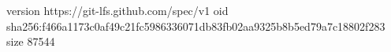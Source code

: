 version https://git-lfs.github.com/spec/v1
oid sha256:f466a1173c0af49c21fc5986336071db83fb02aa9325b8b5ed79a7c18802f283
size 87544
